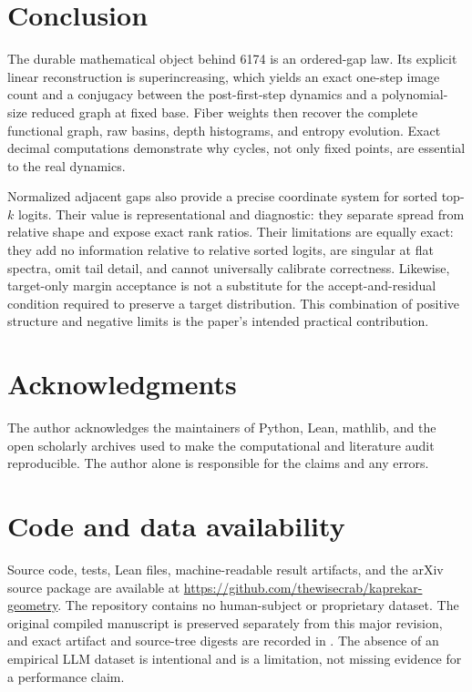 \documentclass[11pt]{article}
\theoremstyle{definition}
\theoremstyle{remark}
\newcommand{\1}{\mathbf{1}}
\begin{document}
\section{Conclusion}

The durable mathematical object behind 6174 is an ordered-gap law.  Its
explicit linear reconstruction is superincreasing, which yields an exact
one-step image count and a conjugacy between the post-first-step dynamics and
a polynomial-size reduced graph at fixed base.  Fiber weights then recover the
complete functional graph, raw basins, depth histograms, and entropy evolution.
Exact decimal computations demonstrate why cycles, not only fixed points, are
essential to the real dynamics.

Normalized adjacent gaps also provide a precise coordinate system for sorted
top-$k$ logits.  Their value is representational and diagnostic: they separate
spread from relative shape and expose exact rank ratios.  Their limitations
are equally exact: they add no information relative to relative sorted logits,
are singular at flat spectra, omit tail detail, and cannot universally
calibrate correctness.  Likewise, target-only margin acceptance is not a
substitute for the accept-and-residual condition required to preserve a target
distribution.  This combination of positive structure and negative limits is
the paper's intended practical contribution.

\section*{Acknowledgments}

The author acknowledges the maintainers of Python, Lean, mathlib, and the
open scholarly archives used to make the computational and literature audit
reproducible.  The author alone is responsible for the claims and any errors.

\section*{Code and data availability}

Source code, tests, Lean files, machine-readable result artifacts, and the
arXiv source package are available at
\url{https://github.com/thewisecrab/kaprekar-geometry}.  The repository contains
no human-subject or proprietary dataset.  The original compiled manuscript is
preserved separately from this major revision, and exact artifact and
source-tree digests are recorded in .  The absence
of an empirical LLM dataset is intentional and is a limitation, not missing
evidence for a performance claim.


\begingroup
\raggedright

\endgroup
\end{document}
